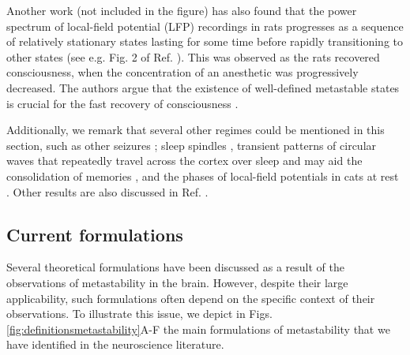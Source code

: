 \documentclass[reprint,superscriptaddress,showpacs,amsmath,amssymb,aps,floatfix,nolongbibliography]{revtex4-2}
\theoremstyle{definition}
\newcommand{\lm}[1]{\textcolor{blue}{#1}}
\begin{document}
Another work (not included in the figure) has also found that the power spectrum of local-field potential (LFP) recordings in rats progresses as a sequence of relatively stationary states lasting for some time before rapidly transitioning to other states \cite{hudson2014recovery} (see e.g. Fig. 2 of Ref. \cite{hudson2014recovery}). This was observed as the rats recovered consciousness, when the concentration of an anesthetic was progressively decreased. The authors argue that the existence of well-defined metastable states is crucial for the fast recovery of consciousness \cite{hudson2014recovery}.

Additionally, we remark that several other regimes could be mentioned in this section, such as other seizures \cite{curtis2015initiation, babloyantz1986low}; sleep spindles \cite{fernandez2020sleep}, transient patterns of circular waves that repeatedly travel across the cortex over sleep and may aid the consolidation of memories \cite{muller2016rotating}, and the phases of local-field potentials in cats at rest \cite{tognoli2014metastable, popa2009constracting}. Other results are also discussed in Ref. \cite{tsuda2009hypotheses}.


\subsection{Current formulations}\label{sec:currentformulations}

Several theoretical formulations have been discussed as a result of the observations of metastability in the brain. However, despite their large applicability, such formulations often depend on the specific context of their observations. To illustrate this issue, we depict in Figs. \ref{fig:definitionsmetastability}A-F the main formulations of metastability that we have identified in the neuroscience literature.
\end{document}
